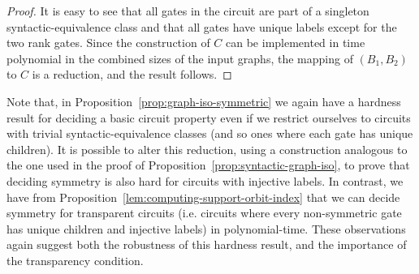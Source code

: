 \documentclass[../paper.tex]{subfiles}
\begin{document}
\begin{proof}






  It is easy to see that all gates in the circuit are part of a singleton
  syntactic-equivalence class and that all gates have unique labels except for
  the two rank gates. Since the construction of $C$ can be implemented in time
  polynomial in the combined sizes of the input graphs, the mapping of $(B_1,
  B_2)$ to $C$ is a reduction, and the result follows.
\end{proof}

Note that, in Proposition~\ref{prop:graph-iso-symmetric} we again have a
hardness result for deciding a basic circuit property even if we restrict
ourselves to circuits with trivial syntactic-equivalence classes (and so ones
where each gate has unique children). It is possible to alter this reduction,
using a construction analogous to the one used in the proof of
Proposition~\ref{prop:syntactic-graph-iso}, to prove that deciding symmetry is
also hard for circuits with injective labels. In contrast, we have from
Proposition~\ref{lem:computing-support-orbit-index} that we can decide symmetry
for transparent circuits (i.e. circuits where every non-symmetric gate has
unique children and injective labels) in polynomial-time. These observations
again suggest both the robustness of this hardness result, and the importance of
the transparency condition.
\end{document}
